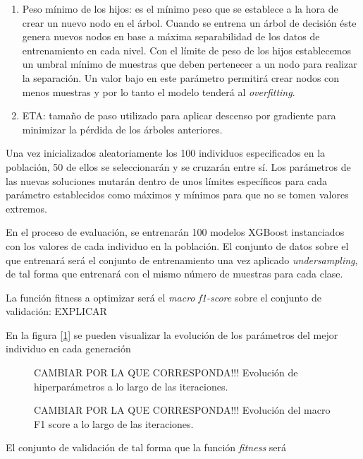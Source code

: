 \begin{enumerate}
\begin{enumerate}
                \item Peso mínimo de los hijos: es el mínimo peso que se establece a la hora de crear un nuevo nodo en el árbol. Cuando se entrena un árbol de decisión éste genera nuevos nodos en base a máxima separabilidad de los datos de entrenamiento en cada nivel. Con el límite de peso de los hijos establecemos un umbral mínimo de muestras que deben pertenecer a un nodo para realizar la separación. Un valor bajo en este parámetro permitirá crear nodos con menos muestras y por lo tanto el modelo tenderá al \textit{overfitting}.

                \item ETA: tamaño de paso utilizado para aplicar descenso por gradiente para minimizar la pérdida de los árboles anteriores.

            \end{enumerate}

            Una vez inicializados aleatoriamente los 100 individuos especificados en la población, 50 de ellos se seleccionarán y se cruzarán entre sí. Los parámetros de las nuevas soluciones mutarán dentro de unos límites específicos para cada parámetro establecidos como máximos y mínimos para que no se tomen valores extremos.

            En el proceso de evaluación, se entrenarán 100 modelos XGBoost instanciados con los valores de cada individuo en la población. El conjunto de datos sobre el que entrenará  será el conjunto de entrenamiento una vez aplicado \textit{undersampling}, de tal forma que entrenará con el mismo número de muestras para cada clase.

            La función fitness a optimizar será el \textit{macro f1-score} sobre el conjunto de validación: EXPLICAR

            En la figura [\ref{EvolucionHiperparametrosImage}] se pueden visualizar la evolución de los parámetros del mejor individuo en cada generación

            \begin{figure}[h]
                \centering
                
                \caption{CAMBIAR POR LA QUE CORRESPONDA!!! Evolución de hiperparámetros a lo largo de las iteraciones.}
                \label{EvolucionHiperparametrosImage}
             \end{figure}

            \begin{figure}[h]
                \centering
                
                \caption{CAMBIAR POR LA QUE CORRESPONDA!!! Evolución del macro F1 score a lo largo de las iteraciones.}
                \label{EvolucionF1ScoreImage}
             \end{figure}
            El conjunto de validación de tal forma que la función \textit{fitness} será 


\end{enumerate}
